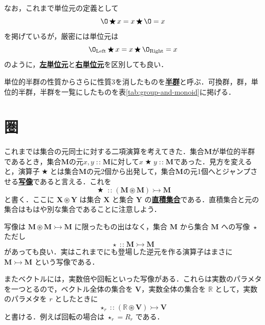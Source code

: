 \documentclass[a4paper,twocolumn]{jsbook}
\newcommand{\keyword}[1]{{\underline{\textbf{#1}}}}
\newcommand{\mZero}{\O}
\DeclareMathOperator{\mBinOp}{\bigstar}
\DeclareMathOperator{\mIn}{{:\!:}}
\DeclareMathOperator{\mMorphTo}{\rightarrowtail}
\DeclareMathOperator{\mSetTimes}{\circledast}
\DeclareMathOperator{\mUnOp}{\star}
\newcommand{\mSpecialSub}[1]{\text{#1}}
\newcommand{\mLeft}{\mSpecialSub{Left}}
\newcommand{\mRight}{\mSpecialSub{Right}}
\newcommand{\mSet}[1]{\mathbf{#1}}
\newcommand{\mSpecialSet}[1]{\mathbb{#1}} %
\newcommand{\mRSet}{\mSpecialSet{R}}
\newcommand{\mMorph}[2]{#1\mMorphTo#2}
\begin{document}
なお，これまで単位元の定義として
\begin{equation}
\mZero\mBinOp x=x\mBinOp\mZero=x
\end{equation}
を掲げているが，厳密には単位元は
\begin{equation}
\mZero_\mLeft\mBinOp x=x\mBinOp\mZero_\mRight=x
\end{equation}
のように，\keyword{左単位元}と\keyword{右単位元}を区別しても良い．

単位的半群の性質からさらに性質3を消したものを\keyword{半群}と呼ぶ．可換群，群，単位的半群，半群を一覧にしたものを表\ref{tab:group-and-monoid}に掲げる．

\section{圏}

これまでは集合の元同士に対する二項演算を考えてきた．集合$\mSet{M}$が単位的半群であるとき，集合$\mSet{M}$の元$x,y\mIn\mSet{M}$に対して$x\mBinOp y\mIn\mSet{M}$であった．見方を変えると，演算子$\mBinOp$とは集合$\mSet{M}$の元2個から出発して，集合$\mSet{M}$の元1個へとジャンプさせる\keyword{写像}であると言える．これを
\begin{equation}
\mBinOp\mIn{}\mMorph{(\mSet{M}\mSetTimes\mSet{M})}{\mSet{M}}
\end{equation}
と書く．ここに $\mSet{X}\circledast\mSet{Y}$ は集合 $\mSet{X}$ と集合 $\mSet{Y}$ の\keyword{直積集合}である．直積集合と元の集合はもはや別な集合であることに注意しよう．

写像は $\mMorph{\mSet{M}\mSetTimes\mSet{M}}{\mSet{M}}$ に限ったもの出はなく，集合 $\mSet{M}$ から集合 $\mSet{M}$ への写像 $\mUnOp$ ただし
\begin{equation}
\mUnOp\mIn\mMorph{\mSet{M}}{\mSet{M}}
\end{equation}
があっても良い．実はこれまでにも登場した逆元を作る演算子はまさに $\mMorph{\mSet{M}}{\mSet{M}}$ という写像である．

またベクトルには，実数倍や回転といった写像がある．これらは実数のパラメタを一つとるので，ベクトル全体の集合を $\mSet{V}$，実数全体の集合を $\mRSet$ として，実数のパラメタを $r$ としたときに
\begin{equation}
\mUnOp_r\mIn{}\mMorph{(\mRSet\mSetTimes\mSet{V})}{\mSet{V}}
\end{equation}
と書ける．例えば回転の場合は $\mUnOp_r=R_r$ である．
\end{document}
